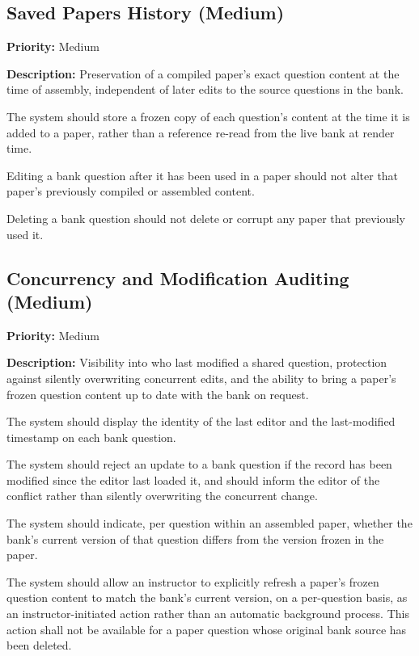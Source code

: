 \documentclass[11pt]{article}
\newcommand{\priority}[1]{\textbf{Priority:} #1}
\newcommand{\reqid}[1]{\textbf{#1}}
\begin{document}
\subsection{Saved Papers History (Medium)}
\priority{Medium}

\textbf{Description:} Preservation of a compiled paper's exact question
content at the time of assembly, independent of later edits to the source
questions in the bank.

\begin{description}[nosep,leftmargin=2.2cm]
  \item[\reqid{REQ-9.1}] The system should store a frozen copy of each
    question's content at the time it is added to a paper, rather than a
    reference re-read from the live bank at render time.
  \item[\reqid{REQ-9.2}] Editing a bank question after it has been used in
    a paper should not alter that paper's previously compiled or assembled
    content.
  \item[\reqid{REQ-9.3}] Deleting a bank question should not delete or
    corrupt any paper that previously used it.
\end{description}

\subsection{Concurrency and Modification Auditing (Medium)}
\priority{Medium}

\textbf{Description:} Visibility into who last modified a shared question,
protection against silently overwriting concurrent edits, and the ability
to bring a paper's frozen question content up to date with the bank on
request.

\begin{description}[nosep,leftmargin=2.2cm]
  \item[\reqid{REQ-10.1}] The system should display the identity of the
    last editor and the last-modified timestamp on each bank question.
  \item[\reqid{REQ-10.2}] The system should reject an update to a bank
    question if the record has been modified since the editor last loaded
    it, and should inform the editor of the conflict rather than silently
    overwriting the concurrent change.
  \item[\reqid{REQ-10.3}] The system should indicate, per question within
    an assembled paper, whether the bank's current version of that question
    differs from the version frozen in the paper.
  \item[\reqid{REQ-10.4}] The system should allow an instructor to
    explicitly refresh a paper's frozen question content to match the
    bank's current version, on a per-question basis, as an
    instructor-initiated action rather than an automatic background
    process. This action shall not be available for a paper question whose
    original bank source has been deleted.
\end{description}
\end{document}
